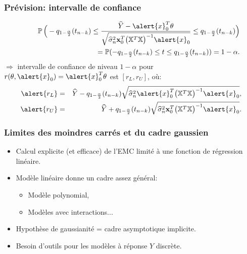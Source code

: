 \begin{frame}
\frametitle{Prévision: intervalle de confiance}
\begin{eqnarray*}
&&\PP \Big(-q_{1-\frac{\alpha}{2}}(t_{n-k}) \le \frac{\widehat Y
-\alert{x}_0^T\truetheta} {\sqrt{\widehat \sigma_n^2 {\bf
x}_0^T\big(\regressmat^T\regressmat\big)^{-1}\alert{x}_0}}\le
q_{1-\frac{\alpha}{2}}(t_{n-k})\Big) \\\hspace{4mm} &&= \PP(-
q_{1-\frac{\alpha}{2}}(t_{n-k}) \le t\le
q_{1-\frac{\alpha}{2}}(t_{n-k})) = 1-\alpha.
\end{eqnarray*}
$\Longrightarrow$ \alert{intervalle de confiance} de niveau
$1-\alpha$ pour $r(\truetheta,\alert{x}_0)=\alert{x}_0^T\truetheta$ est
\alert{$[r_L, r_U]$}, o\`u:
\begin{eqnarray*}
\alert{r_L}&=&\widehat Y -
q_{1-\frac{\alpha}{2}}(t_{n-k})\sqrt{\widehat \sigma_n^2
\alert{x}_0^T\big(\regressmat^T\regressmat\big)^{-1}\alert{x}_0},\\
\alert{r_U}&=& \widehat Y +
q_{1-\frac{\alpha}{2}}(t_{n-k})\sqrt{\widehat \sigma_n^2 {\bf
x}_0^T\big(\regressmat^T\regressmat\big)^{-1}\alert{x}_0}.
\end{eqnarray*}
\end{frame}



\begin{frame}
\frametitle{Limites des moindres carrés et du cadre gaussien}
\begin{itemize}
\item Calcul \alert{explicite} (et efficace) de l'EMC  limité à
une fonction de régression \alert{linéaire}.
\item Modèle linéaire donne un cadre assez général:
\begin{itemize}
\item Modèle
polynomial, \item \alert{Modèles avec interactions...}
\end{itemize}
\item \alert{ Hypothèse de gaussianité} = cadre asymptotique implicite.
\item Besoin d'outils pour les modèles  à réponse \alert{$Y$ discrète}.
\end{itemize}
\end{frame}



